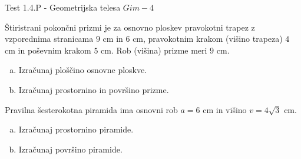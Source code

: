 \documentclass[a4paper,12pt]{letter}
\renewcommand{\headrulewidth}{3pt}
\renewcommand{\headrulewidth}{0.3pt}
\newcounter{tocke}
\begin{document}
\pagestyle{fancy}
\renewcommand\headrulewidth{0pt}
\lhead{}\chead{}\rhead{}
\rfoot{\vspace*{-2\baselineskip}}
\renewcommand{\vec}{\overrightarrow}
\def\programletnik{Gim - 4}
\def\naslov{Test 1.4.P - }
\def\sklop{Geometrijska telesa}
\def\tockeA{3+4}
\def\tockeB{4+4}
\def\tockeC{3+3+4}
\def\tockeD{3+3+4}
\begin{minipage}{20cm}
\begin{bclogo}[couleur=brown!30,
  arrondi=0,ombre=true, couleurOmbre=gray!50,
logo =\bcplume,
  noborder=true]
{\textrm{{\Large{\naslov \sklop} \Huge{}
\large{} \hfill $\programletnik$}}}
\end{bclogo}
\end{minipage}
\begin{minipage}{20cm}
\begin{bclogo}[couleur=brown!30,
  arrondi=0,ombre=true, couleurOmbre=gray!50,
logo =\bcplume,
  noborder=true]
{\textrm{{}}}
\end{bclogo}
\end{minipage}

\begin{naloga}[\hfill $\tockeA$] \addtocounter{tocke}{\numexpr\tockeA\relax}
\v{S}tiristrani pokon\v{c}ni prizmi je za osnovno ploskev pravokotni trapez z vzporednima stranicama $9$ cm in $6$ cm, pravokotnim krakom (vi\v{s}ino trapeza) $4$ cm in po\v{s}evnim krakom $5$ cm. Rob (vi\v{s}ina) prizme meri $9$ cm.
\begin{enumerate}[a)]
\item Izra\v{c}unaj plo\v{s}\v{c}ino osnovne ploskve.
\item Izra\v{c}unaj prostornino in povr\v{s}ino prizme.
\end{enumerate}
\end{naloga}\newpage

\begin{naloga}[\hfill $\tockeB$] \addtocounter{tocke}{\numexpr\tockeB\relax}
Pravilna \v{s}esterokotna piramida ima osnovni rob $a=6$ cm in vi\v{s}ino $v=4\sqrt{3}$ cm.
\begin{enumerate}[a)]
\item Izra\v{c}unaj prostornino piramide.
\item Izra\v{c}unaj povr\v{s}ino piramide.
\end{enumerate}
\end{naloga}\newpage
\end{document}
